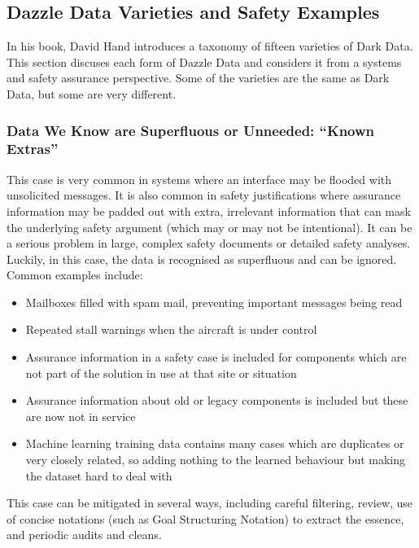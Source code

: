\subsection{Dazzle Data Varieties and Safety Examples}
In his book, David Hand introduces a taxonomy of fifteen varieties of Dark Data. This section discuses each form of Dazzle Data and considers it from a systems and safety assurance perspective.
Some of the varieties are the same as Dark Data, but some are very different.

\subsubsection{Data We Know are Superfluous or Unneeded: ``Known Extras''}
\label{bkm:dazzledata:case1}

This case is very common in systems where an interface may be flooded with unsolicited messages.
It is also common in  safety justifications where assurance \gls{information} may be padded out with extra, irrelevant \gls{information} that can mask the underlying safety argument (which may or may not be intentional).
It can be a serious problem in large, complex safety documents or detailed safety analyses.
Luckily, in this case, the data is recognised as superfluous and can be ignored.
Common examples include:
\begin{itemize}
    \item Mailboxes filled with spam mail, preventing important messages being read
    \item Repeated stall warnings when the aircraft is under control
    \item Assurance \gls{information} in a safety case is included for components which are not part of the solution in use at that site or situation
    \item Assurance \gls{information} about old or legacy components is included but these are now not in service
    \item Machine learning training data contains many cases which are duplicates or very closely related, so adding nothing to the learned behaviour but making the \gls{dataset} hard to deal with
\end{itemize}
This case can be mitigated in several ways, including careful filtering, review, use of concise  notations (such as Goal Structuring Notation) to extract the essence, and periodic audits and cleans.

